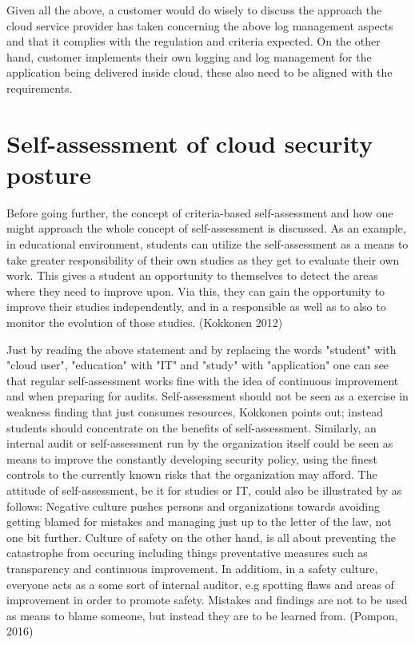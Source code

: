 \documentclass{article}
\begin{document}
\par
Given all the above, a customer would do wisely to discuss the approach the cloud service provider has taken concerning the above log management aspects and that it complies with the regulation and criteria expected. On the other hand, customer implements their own logging and log management for the application being delivered inside cloud, these also need to be aligned with the requirements.
\section{Self-assessment of cloud security posture}
Before going further, the concept of criteria-based self-assessment and how one might approach the whole concept of self-assessment is discussed. 
As an example, in educational environment, students can utilize the self-assessment as a means to take greater responsibility of their own studies as they get to evaluate their own work. This gives a student an opportunity to themselves to detect the areas where they need to improve upon.
Via this, they can gain the opportunity to improve their studies independently, and in a responsible as well as to also to monitor the evolution of those studies. (Kokkonen 2012)
\par
Just by reading the above statement and by replacing the words "student" with "cloud user", "education" with "IT" and "study" with "application" one can see that regular self-assessment works fine with the idea of continuous improvement and when preparing for audits.
Self-assessment should not be seen as a exercise in weakness finding that just consumes resources, Kokkonen points out; instead students should concentrate on the benefits of self-assessment.
Similarly, an internal audit or self-assessment run by the organization itself could be seen as means to improve the constantly developing security policy, using the finest controls to the currently known risks that the organization may afford.
The attitude of self-assessment, be it for studies or IT, could also be illustrated by as follows: Negative culture pushes persons and organizations towards avoiding getting blamed for mistakes and managing just up to the letter of the law, not one bit further.
Culture of safety on the other hand, is all about preventing the catastrophe from occuring including things preventative measures such as transparency and continuous improvement. In additiom, in a safety culture, everyone acts as a some sort of internal auditor, e.g spotting flaws and areas of improvement in order to promote safety. Mistakes and findings are not to be used as means to blame someone, but instead they are to be learned from. (Pompon, 2016)
\end{document}
